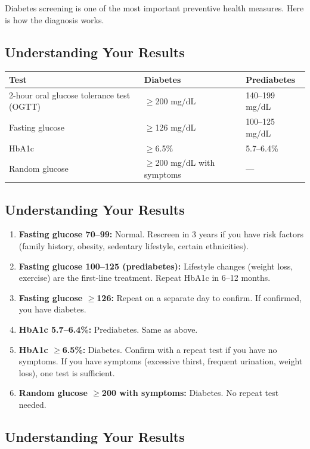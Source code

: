 Diabetes screening is one of the most important preventive health measures. Here is how the diagnosis works.

\subsection{Understanding Your Results}

\begin{longtable}{@{}lll@{}}
\toprule
\textbf{Test} & \textbf{Diabetes} & \textbf{Prediabetes} \\
\midrule
2-hour oral glucose tolerance test (OGTT) & $\geq$200 mg/dL & 140--199 mg/dL \\
Fasting glucose & $\geq$126 mg/dL & 100--125 mg/dL \\
HbA1c & $\geq$6.5\% & 5.7--6.4\% \\
Random glucose & $\geq$200 mg/dL with symptoms & --- \\
\bottomrule
\end{longtable}

\subsection{Understanding Your Results}

\begin{enumerate}
    \item \textbf{Fasting glucose 70--99:} Normal. Rescreen in 3 years if you have risk factors (family history, obesity, sedentary lifestyle, certain ethnicities).
    \item \textbf{Fasting glucose 100--125 (prediabetes):} Lifestyle changes (weight loss, exercise) are the first-line treatment. Repeat HbA1c in 6--12 months.
    \item \textbf{Fasting glucose $\geq$126:} Repeat on a separate day to confirm. If confirmed, you have diabetes.
    \item \textbf{HbA1c 5.7--6.4\%:} Prediabetes. Same as above.
    \item \textbf{HbA1c $\geq$6.5\%:} Diabetes. Confirm with a repeat test if you have no symptoms. If you have symptoms (excessive thirst, frequent urination, weight loss), one test is sufficient.
    \item \textbf{Random glucose $\geq$200 with symptoms:} Diabetes. No repeat test needed.
\end{enumerate}

\subsection{Understanding Your Results}

